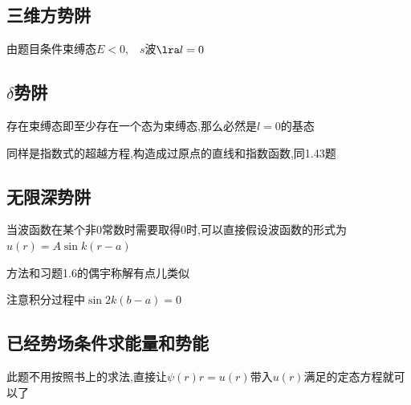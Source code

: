         \subsection{三维方势阱}
            由题目条件束缚态$E<0$,$\quad s$波$\lra l = 0$

        \subsection{\texorpdfstring{$\delta$}{}势阱}
            存在束缚态即至少存在一个态为束缚态,那么必然是$l=0$的基态

            同样是指数式的超越方程,构造成过原点的直线和指数函数,同1.43题

        \subsection{无限深势阱}
            当波函数在某个非0常数时需要取得0时,可以直接假设波函数的形式为$u(r) = A \sin{k(r-a)}$

            方法和习题1.6的偶宇称解有点儿类似

            注意积分过程中$\sin{2k(b-a)} = 0$

        \subsection{已经势场条件求能量和势能}
            此题不用按照书上的求法,直接让$\psi(r)r = u(r) $带入$u(r)$满足的定态方程就可以了

